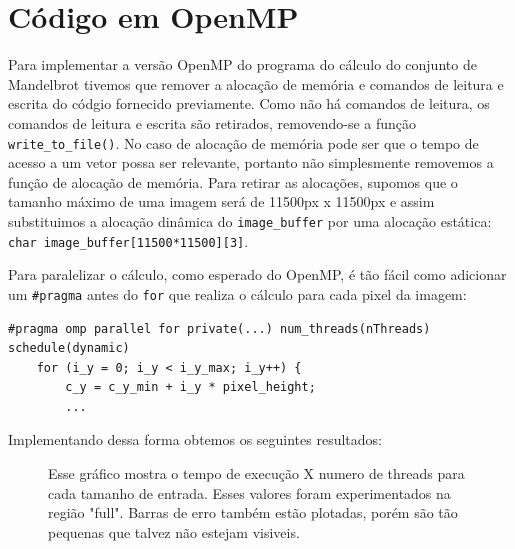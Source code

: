 \documentclass[12pt]{article}
\newcommand{\code}[1]{\texttt{#1}}
\begin{document}
\newpage
\section{Código em OpenMP}
Para implementar a versão OpenMP do programa do cálculo do conjunto de Mandelbrot tivemos que remover a alocação de memória e comandos de leitura e escrita do códgio fornecido previamente.
Como não há comandos de leitura, os comandos de leitura e escrita são retirados, removendo-se a função \code{write\_to\_file()}. No caso de alocação de memória pode ser que o tempo de acesso a um vetor possa ser relevante, portanto não simplesmente removemos a função de alocação de memória. Para retirar as alocações, supomos que o tamanho máximo de uma imagem será de 11500px x 11500px e assim substituimos a alocação dinâmica do \code{image\_buffer} por uma alocação estática: \code{char image\_buffer[11500*11500][3]}.

Para paralelizar o cálculo, como esperado do OpenMP, é tão fácil como adicionar um \code{\#pragma} antes do \code{for} que realiza o cálculo para cada pixel da imagem:
\begin{lstlisting}[style=CStyle]
    #pragma omp parallel for private(...) num_threads(nThreads) schedule(dynamic)
    for (i_y = 0; i_y < i_y_max; i_y++) {
        c_y = c_y_min + i_y * pixel_height;
        ...
\end{lstlisting}

Implementando dessa forma obtemos os seguintes resultados:
\begin{figure}[H]
    \caption{Esse gráfico mostra o tempo de execução X numero de threads para cada tamanho de entrada. Esses valores foram experimentados na região "full". Barras de erro também estão plotadas, porém são tão pequenas que talvez não estejam visiveis.}
\end{figure}
\end{document}
